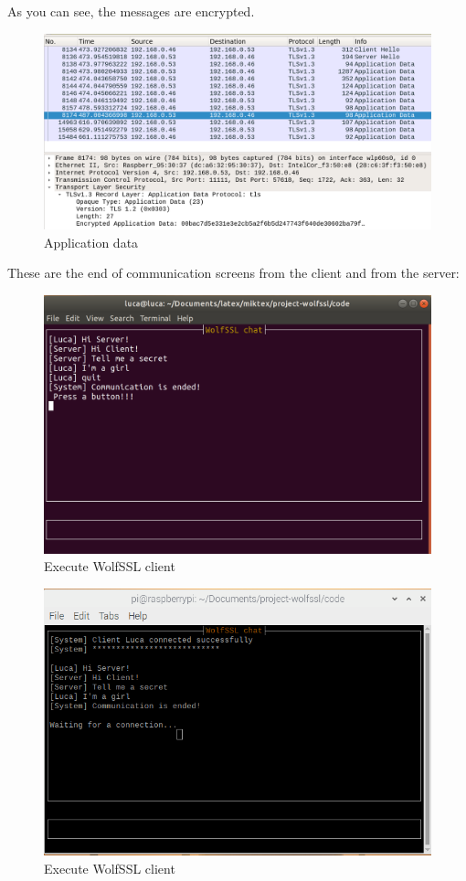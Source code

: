 \documentclass[a4paper,12pt]{report}
\begin{document}
As you can see, the messages are encrypted.
\begin{figure}[H]
    \centering
    \includegraphics[scale=0.248]{./code/img/application_data.png}
    \caption{Application data}
    
\end{figure}
\pagebreak
These are the end of communication screens from the client and from the server:
\begin{figure}[H]
    \centering
    \includegraphics[scale=0.2]{./code/img/3-client.png}
    \caption{Execute WolfSSL client}
    
\end{figure}
\begin{figure}[H]
    \centering
    \includegraphics[scale=0.45]{./code/img/4-server.png}
    \caption{Execute WolfSSL client}
    
\end{figure}
\end{document}

